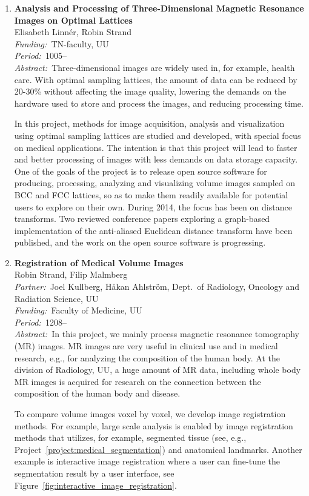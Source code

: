 \documentclass[10pt, a4paper]{article}
\newcommand{\aabstract}[1]{\emph{Abstract:~}#1}
\newcommand{\ffunding}[1]{\emph{Funding:~}#1\\}
\newcommand{\ppartner}[1]{\emph{Partner:~}#1\\}
\newcommand{\pperiod}[1]{\emph{Period:~}#1\\}
\begin{document}
\begin{enumerate}
\newpage
\item 
\label{proj:MRI_optimal_lattices}
\textbf{Analysis and Processing of Three-Dimensional Magnetic Resonance Images on Optimal Lattices} \\
Elisabeth Linn\'{e}r, Robin Strand\\
\ffunding{TN-faculty, UU}
\pperiod{1005--}
\aabstract{Three-dimensional images are widely used in, for example, health care. With optimal sampling lattices, the amount of data can be reduced by 20-30\% without affecting the image quality, lowering the demands on the hardware used to store and process the images, and reducing processing time.

In this project, methods for image acquisition, analysis and visualization using optimal sampling lattices are studied and developed, with special focus on medical applications. The intention is that this project will lead to faster and better processing of images with less demands on data storage capacity. One of the goals of the project is to release open source software for producing, processing, analyzing and visualizing volume images sampled on BCC and FCC lattices, so as to make them readily available for potential users to explore on their own.
During 2014, the focus has been on distance transforms. Two reviewed conference papers exploring a graph-based implementation of the anti-aliased Euclidean distance transform have been published, and the work on the open source software is progressing.}


\item 
\label{proj:MRI_registration}
\textbf{Registration of Medical Volume Images}\\
Robin Strand, Filip Malmberg\\
\ppartner{Joel Kullberg, H{\aa}kan Ahlstr\"{o}m, Dept.~of Radiology, Oncology and Radiation Science, UU}
\ffunding{Faculty of Medicine, UU}
\pperiod{1208--}
\aabstract{In this project, we mainly process magnetic resonance tomography (MR) images. MR images are very useful in clinical use and in medical research, e.g., for analyzing the composition of the human body. At the division of Radiology, UU, a huge amount of MR data, including whole body MR images is acquired for research on the connection between the composition of the human body and disease.

To compare volume images voxel by voxel, we develop image registration methods. For example, large scale analysis is enabled by image registration methods that utilizes, for example, segmented tissue (see, e.g., Project~\ref{project:medical_segmentation}) and anatomical landmarks. Another example is interactive image registration where a user can fine-tune the segmentation result by a user interface, see Figure~\ref{fig:interactive_image_registration}.}


\end{enumerate}
\end{document}
